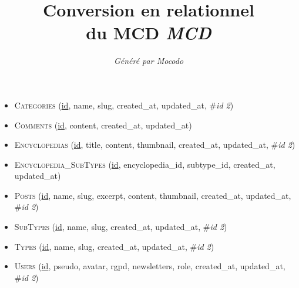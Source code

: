 \documentclass[a4paper]{article}
\title{Conversion en relationnel\\du MCD \emph{MCD}}
\author{\emph{Généré par Mocodo}}
\newcommand{\relat}[1]{\textsc{#1}}
\newcommand{\attr}[1]{#1}
\newcommand{\prim}[1]{\uline{#1}}
\newcommand{\foreign}[1]{\#\textsl{#1}}
\begin{document}
\maketitle

\begin{itemize}
  \item \relat{Categories} (\prim{id}, \attr{name}, \attr{slug}, \attr{created\_at}, \attr{updated\_at}, \foreign{id 2})
  \item \relat{Comments} (\prim{id}, \attr{content}, \attr{created\_at}, \attr{updated\_at})
  \item \relat{Encyclopedias} (\prim{id}, \attr{title}, \attr{content}, \attr{thumbnail}, \attr{created\_at}, \attr{updated\_at}, \foreign{id 2})
  \item \relat{Encyclopedia\_SubTypes} (\prim{id}, \attr{encyclopedia\_id}, \attr{subtype\_id}, \attr{created\_at}, \attr{updated\_at})
  \item \relat{Posts} (\prim{id}, \attr{name}, \attr{slug}, \attr{excerpt}, \attr{content}, \attr{thumbnail}, \attr{created\_at}, \attr{updated\_at}, \foreign{id 2})
  \item \relat{SubTypes} (\prim{id}, \attr{name}, \attr{slug}, \attr{created\_at}, \attr{updated\_at}, \foreign{id 2})
  \item \relat{Types} (\prim{id}, \attr{name}, \attr{slug}, \attr{created\_at}, \attr{updated\_at}, \foreign{id 2})
  \item \relat{Users} (\prim{id}, \attr{pseudo}, \attr{avatar}, \attr{rgpd}, \attr{newsletters}, \attr{role}, \attr{created\_at}, \attr{updated\_at}, \foreign{id 2})
\end{itemize}
\end{document}
